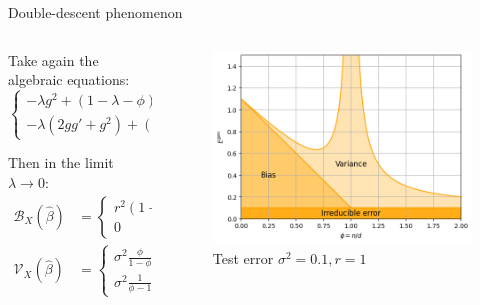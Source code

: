 \documentclass[10pt]{beamer}
\begin{document}
\begin{frame}{Double-descent phenomenon}
  \begin{columns}
    \begin{column}{0.5\textwidth}
      Take again the algebraic equations:
      \vspace*{-0.2cm}
      $$
      \begin{cases}
        -\lambda g^2 + (1 - \lambda - \phi) g +1 = 0 \\
        -\lambda (2gg' + g^2) + (1 - \lambda - \phi) g' + g = 0
      \end{cases}
      $$


      Then in the limit $\lambda \to 0$:
      \begin{align*}
        \mathcal B_X(\hat \beta) & = \begin{cases} r^2 (1-\phi)  & \text{if } \phi < 1\\
        0 & \text{if } \phi > 1
        \end{cases}\\
        \mathcal V_X(\hat \beta) & = \begin{cases} \sigma^2 \frac{\phi}{1-\phi} & \text{if } \phi < 1\\
        \sigma^2 \frac{1}{\phi - 1} & \text{if } \phi > 1
        \end{cases}
      \end{align*}
    \end{column}
    \begin{column}{0.5\textwidth}
      \vspace*{0.2cm}
      \begin{figure}
        \centering
        \includegraphics[width=\textwidth]{images/bias-variance.white.png}
        \caption{Test error $\sigma^2 = 0.1, r=1$}
      \end{figure}
    \end{column}
  \end{columns}


\end{frame}
\end{document}
